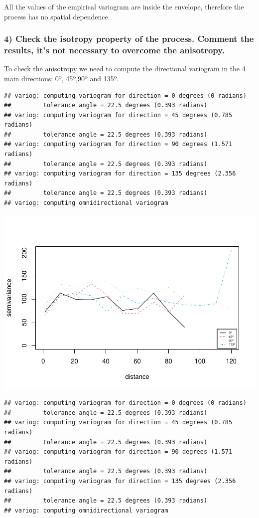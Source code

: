 \documentclass[
]{article}
\begin{document}
All the values of the empirical variogram are inside the envelope,
therefore the process has no spatial dependence.

\hypertarget{check-the-isotropy-property-of-the-process.-comment-the-results-its-not-necessary-to-overcome-the-anisotropy.}{%
\subsubsection{4) Check the isotropy property of the process. Comment
the results, it's not necessary to overcome the
anisotropy.}\label{check-the-isotropy-property-of-the-process.-comment-the-results-its-not-necessary-to-overcome-the-anisotropy.}}

To check the anisotropy we need to compute the directional variogram in
the 4 main directions: 0º, 45º,90º and 135º.

\begin{verbatim}
## variog: computing variogram for direction = 0 degrees (0 radians)
##         tolerance angle = 22.5 degrees (0.393 radians)
## variog: computing variogram for direction = 45 degrees (0.785 radians)
##         tolerance angle = 22.5 degrees (0.393 radians)
## variog: computing variogram for direction = 90 degrees (1.571 radians)
##         tolerance angle = 22.5 degrees (0.393 radians)
## variog: computing variogram for direction = 135 degrees (2.356 radians)
##         tolerance angle = 22.5 degrees (0.393 radians)
## variog: computing omnidirectional variogram
\end{verbatim}

\includegraphics{Assignment_1_files/figure-latex/unnamed-chunk-21-1.pdf}

\begin{verbatim}
## variog: computing variogram for direction = 0 degrees (0 radians)
##         tolerance angle = 22.5 degrees (0.393 radians)
## variog: computing variogram for direction = 45 degrees (0.785 radians)
##         tolerance angle = 22.5 degrees (0.393 radians)
## variog: computing variogram for direction = 90 degrees (1.571 radians)
##         tolerance angle = 22.5 degrees (0.393 radians)
## variog: computing variogram for direction = 135 degrees (2.356 radians)
##         tolerance angle = 22.5 degrees (0.393 radians)
## variog: computing omnidirectional variogram
\end{verbatim}
\end{document}
